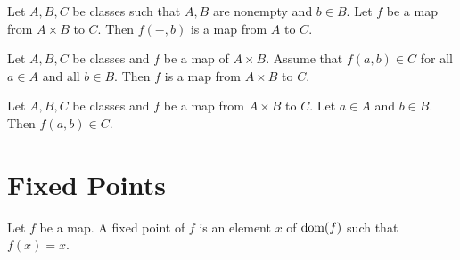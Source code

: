 \documentclass[10pt]{article}
\begin{document}
  \begin{forthel}
    \begin{proposition}
      Let $A, B, C$ be classes such that $A, B$ are nonempty and $b \in B$.
      Let $f$ be a map from $A \times B$ to $C$.
      Then $f(-,b)$ is a map from $A$ to $C$.
    \end{proposition}
  \end{forthel}

  \begin{forthel}
    \begin{proposition}
      Let $A, B, C$ be classes and $f$ be a map of $A \times B$.
      Assume that $f(a,b) \in C$ for all $a \in A$ and all $b \in B$.
      Then $f$ is a map from $A \times B$ to $C$.
    \end{proposition}
  \end{forthel}

  \begin{forthel}
    \begin{proposition}
      Let $A, B, C$ be classes and $f$ be a map from $A \times B$ to $C$.
      Let $a \in A$ and $b \in B$.
      Then $f(a,b) \in C$.
    \end{proposition}
  \end{forthel}


  \section{Fixed Points}

  \begin{forthel}
    \begin{definition}
      Let $f$ be a map.
      A fixed point of $f$ is an element $x$ of $\operatorname{dom}(f)$ such that $f(x) = x$.
    \end{definition}
  \end{forthel}
\end{document}
